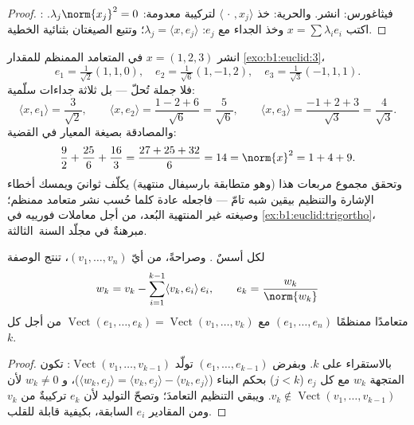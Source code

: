 \begin{proof}
فيثاغورس: انشر. والحرية: خذ $\langle\,\cdot\,, x_j\rangle$
لتركيبة معدومة: $\lambda_j \norm{x_j}^2 = 0$. :
اكتب $x = \sum \lambda_i e_i$ وخذ الجداء مع $e_j$:
$\lambda_j = \langle x, e_j\rangle$؛ وتتبع الصيغتان
بثنائية الخطية.
\end{proof}

\begin{example}
\label{ex:b1:euclid:parsevalcheck}
انشر $x = (1, 2, 3)$ في  المتعامد الممنظم للمقدار
\cref{exo:b1:euclid:3}،
\[
e_1 = \tfrac{1}{\sqrt2}(1,1,0), \quad
e_2 = \tfrac{1}{\sqrt6}(1,-1,2), \quad
e_3 = \tfrac{1}{\sqrt3}(-1,1,1).
\]
فلا جملة تُحلّ --- بل ثلاثة جداءات سلّمية:
\[
\langle x, e_1\rangle = \frac{3}{\sqrt2},
\qquad
\langle x, e_2\rangle = \frac{1 - 2 + 6}{\sqrt6} =
\frac{5}{\sqrt6},
\qquad
\langle x, e_3\rangle = \frac{-1 + 2 + 3}{\sqrt3} =
\frac{4}{\sqrt3}.
\]
والمصادقة بصيغة المعيار في القضية:
\[
\frac{9}{2} + \frac{25}{6} + \frac{16}{3}
= \frac{27 + 25 + 32}{6} = 14 = \norm{x}^2 = 1 + 4 + 9 .
\]
وتحقق مجموع مربعات  هذا (وهو متطابقة بارسيفال
منتهية) يكلّف ثوانيَ ويمسك أخطاء الإشارة والتنظيم
بيقين شبه تامّ --- فاجعله عادة كلما حُسب
نشر متعامد ممنظم؛ وصيغته غير المنتهية البُعد، من أجل
معاملات فورييه في \cref{ex:b1:euclid:trigortho}، مبرهنةٌ في مجلّد السنة~الثالثة.
\end{example}

\begin{theorem}\label{thm:b1:euclid:gramschmidt}
لكل  أسسٌ . وصراحةً، من أيّ
 $(v_1, \dots, v_n)$، تنتج الوصفة
\[
w_k = v_k - \sum_{i=1}^{k-1} \langle v_k, e_i\rangle\, e_i ,
\qquad
e_k = \frac{w_k}{\norm{w_k}}
\]
 متعامدًا ممنظمًا $(e_1, \dots, e_n)$ مع
$\operatorname{Vect}(e_1, \dots, e_k) = \operatorname{Vect}(v_1,
\dots, v_k)$ من أجل كل $k$.
\end{theorem}

\begin{proof}
بالاستقراء على $k$. وبفرض $(e_1, \dots, e_{k-1})$ 
تولّد $\operatorname{Vect}(v_1, \dots, v_{k-1})$: تكون المتجهة
$w_k$  مع كل $e_j$ ($j < k$) بحكم البناء
($\langle w_k, e_j \rangle = \langle v_k, e_j\rangle - \langle v_k,
e_j\rangle$)، و $w_k \neq 0$ لأن $v_k \notin
\operatorname{Vect}(v_1, \dots, v_{k-1})$. ويبقي التنظيم
التعامدَ؛ وتصحّ  التوليد لأن $e_k$
تركيبةٌ من $v_k$ ومن المقادير $e_i$ السابقة، بكيفية قابلة للقلب.
\end{proof}

